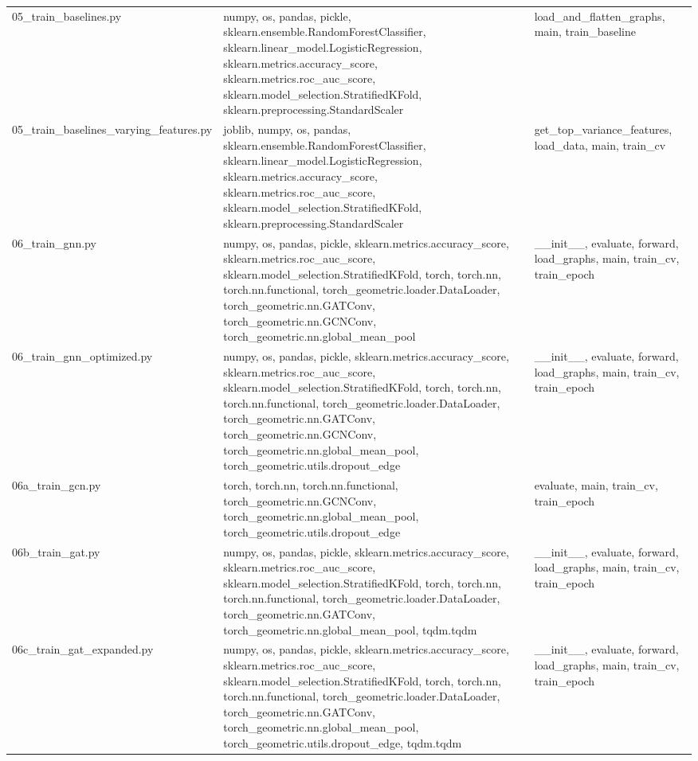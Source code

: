 \documentclass[11pt]{article}
\begin{document}
\begin{longtable}{p{}p{}p{}}
05\_train\_baselines.py & numpy, os, pandas, pickle, sklearn.ensemble.RandomForestClassifier, sklearn.linear\_model.LogisticRegression, sklearn.metrics.accuracy\_score, sklearn.metrics.roc\_auc\_score, sklearn.model\_selection.StratifiedKFold, sklearn.preprocessing.StandardScaler & load\_and\_flatten\_graphs, main, train\_baseline \\
05\_train\_baselines\_varying\_features.py & joblib, numpy, os, pandas, sklearn.ensemble.RandomForestClassifier, sklearn.linear\_model.LogisticRegression, sklearn.metrics.accuracy\_score, sklearn.metrics.roc\_auc\_score, sklearn.model\_selection.StratifiedKFold, sklearn.preprocessing.StandardScaler & get\_top\_variance\_features, load\_data, main, train\_cv \\
06\_train\_gnn.py & numpy, os, pandas, pickle, sklearn.metrics.accuracy\_score, sklearn.metrics.roc\_auc\_score, sklearn.model\_selection.StratifiedKFold, torch, torch.nn, torch.nn.functional, torch\_geometric.loader.DataLoader, torch\_geometric.nn.GATConv, torch\_geometric.nn.GCNConv, torch\_geometric.nn.global\_mean\_pool & \_\_init\_\_, evaluate, forward, load\_graphs, main, train\_cv, train\_epoch \\
06\_train\_gnn\_optimized.py & numpy, os, pandas, pickle, sklearn.metrics.accuracy\_score, sklearn.metrics.roc\_auc\_score, sklearn.model\_selection.StratifiedKFold, torch, torch.nn, torch.nn.functional, torch\_geometric.loader.DataLoader, torch\_geometric.nn.GATConv, torch\_geometric.nn.GCNConv, torch\_geometric.nn.global\_mean\_pool, torch\_geometric.utils.dropout\_edge & \_\_init\_\_, evaluate, forward, load\_graphs, main, train\_cv, train\_epoch \\
06a\_train\_gcn.py & torch, torch.nn, torch.nn.functional, torch\_geometric.nn.GCNConv, torch\_geometric.nn.global\_mean\_pool, torch\_geometric.utils.dropout\_edge & evaluate, main, train\_cv, train\_epoch \\
06b\_train\_gat.py & numpy, os, pandas, pickle, sklearn.metrics.accuracy\_score, sklearn.metrics.roc\_auc\_score, sklearn.model\_selection.StratifiedKFold, torch, torch.nn, torch.nn.functional, torch\_geometric.loader.DataLoader, torch\_geometric.nn.GATConv, torch\_geometric.nn.global\_mean\_pool, tqdm.tqdm & \_\_init\_\_, evaluate, forward, load\_graphs, main, train\_cv, train\_epoch \\
06c\_train\_gat\_expanded.py & numpy, os, pandas, pickle, sklearn.metrics.accuracy\_score, sklearn.metrics.roc\_auc\_score, sklearn.model\_selection.StratifiedKFold, torch, torch.nn, torch.nn.functional, torch\_geometric.loader.DataLoader, torch\_geometric.nn.GATConv, torch\_geometric.nn.global\_mean\_pool, torch\_geometric.utils.dropout\_edge, tqdm.tqdm & \_\_init\_\_, evaluate, forward, load\_graphs, main, train\_cv, train\_epoch \\

\end{longtable}
\end{document}
